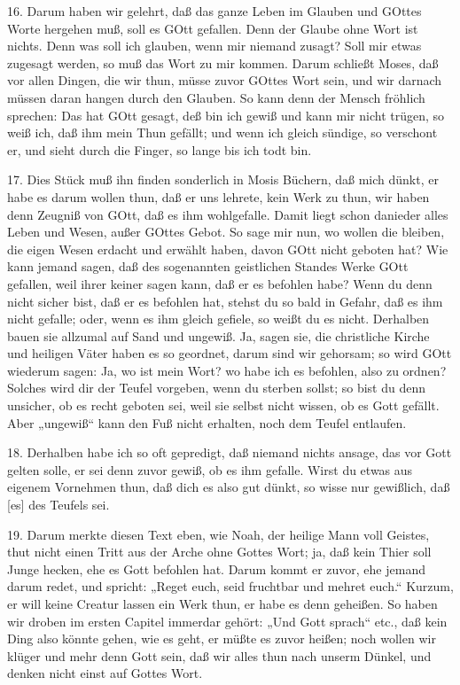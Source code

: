 16. Darum haben wir gelehrt, daß das ganze Leben im Glauben und GOttes Worte hergehen muß, soll es GOtt gefallen. Denn der Glaube ohne Wort ist nichts. Denn was soll ich glauben, wenn mir niemand zusagt? Soll mir etwas zugesagt werden, so muß das Wort zu mir kommen. Darum schließt Moses, daß vor allen Dingen, die wir thun, müsse zuvor GOttes Wort sein, und wir darnach müssen daran hangen durch den Glauben. So kann denn der Mensch fröhlich sprechen: Das hat GOtt gesagt, deß bin ich gewiß und kann mir nicht trügen, so weiß ich, daß ihm mein Thun gefällt; und wenn ich gleich sündige, so verschont er, und sieht durch die Finger, so lange bis ich todt bin.

17. Dies Stück muß ihn finden sonderlich in Mosis Büchern, daß mich dünkt, er habe es darum wollen thun, daß er uns lehrete, kein Werk zu thun, wir haben denn Zeugniß von GOtt, daß es ihm wohlgefalle. Damit liegt schon danieder alles Leben und Wesen, außer GOttes Gebot. So sage mir nun, wo wollen die bleiben, die eigen Wesen erdacht und erwählt haben, davon GOtt nicht geboten hat? Wie kann jemand sagen, daß des sogenannten geistlichen Standes Werke GOtt gefallen, weil ihrer keiner sagen kann, daß er es befohlen habe? Wenn du denn nicht sicher bist, daß er es befohlen hat, stehst du so bald in Gefahr, daß es ihm nicht gefalle; oder, wenn es ihm gleich gefiele, so weißt du es nicht. Derhalben bauen sie allzumal auf Sand und ungewiß. Ja, sagen sie, die christliche Kirche und heiligen Väter haben es so geordnet, darum sind wir gehorsam; so wird GOtt wiederum sagen: Ja, wo ist mein Wort? wo habe ich es befohlen, also zu ordnen?
Solches wird dir der Teufel vorgeben, wenn du sterben sollst; so bist du denn unsicher, ob es recht geboten sei, weil sie selbst nicht wissen, ob es Gott gefällt. Aber „ungewiß“ kann den Fuß nicht erhalten, noch dem Teufel entlaufen.

18. Derhalben habe ich so oft gepredigt, daß niemand nichts ansage, das vor Gott gelten solle, er sei denn zuvor gewiß, ob es ihm gefalle. Wirst du etwas aus eigenem Vornehmen thun, daß dich es also gut dünkt, so wisse nur gewißlich, daß [es] des Teufels sei.

19. Darum merkte diesen Text eben, wie Noah, der heilige Mann voll Geistes, thut nicht einen Tritt aus der Arche ohne Gottes Wort; ja, daß kein Thier soll Junge hecken, ehe es Gott befohlen hat. Darum kommt er zuvor, ehe jemand darum redet, und spricht: „Reget euch, seid fruchtbar und mehret euch.“ Kurzum, er will keine Creatur lassen ein Werk thun, er habe es denn geheißen. So haben wir droben im ersten Capitel immerdar gehört: „Und Gott sprach“ etc., daß kein Ding also könnte gehen, wie es geht, er müßte es zuvor heißen; noch wollen wir klüger und mehr denn Gott sein, daß wir alles thun nach unserm Dünkel, und denken nicht einst auf Gottes Wort.


